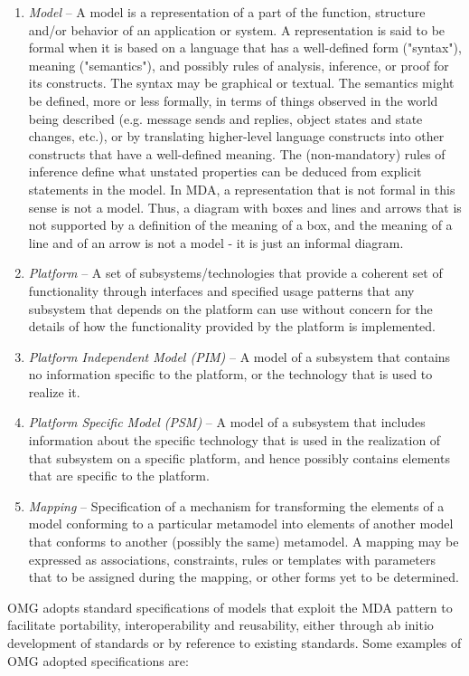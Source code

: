 \begin{enumerate}
\item \textit{Model} -- A model is a representation of a part of the function, structure and/or behavior of an application or system. A representation is said to be formal when it is based on a language that has a well-defined form ("syntax"), meaning ("semantics"), and possibly rules of analysis, inference, or proof for its constructs. The syntax may be graphical or textual. The semantics might be defined, more or less formally, in terms of things observed in the world being described (e.g. message sends and replies, object states and state changes, etc.), or by translating higher-level language constructs into other constructs that have a well-defined meaning. The (non-mandatory) rules of inference define what unstated properties can be deduced from explicit statements in the model. In MDA, a representation that is not formal in this sense is not a model. Thus, a diagram with boxes and lines and arrows that is not supported by a definition of the meaning of a box, and the meaning of a line and of an arrow is not a model - it is just an informal diagram.
\item \textit{Platform} -- A set of subsystems/technologies that provide a coherent set of functionality through interfaces and specified usage patterns that any subsystem that depends on the platform can use without concern for the details of how the functionality provided by the platform is implemented.
\item \textit{Platform Independent Model (PIM)} -- A model of a subsystem that contains no information specific to the platform, or the technology that is used to realize it.
\item \textit{Platform Specific Model (PSM)} -- A model of a subsystem that includes information about the specific technology that is used in the realization of that subsystem on a specific platform, and hence possibly contains elements that are specific to the platform.
\item \textit{Mapping} -- Specification of a mechanism for transforming the elements of a model conforming to a particular metamodel into elements of another model that conforms to another (possibly the same) metamodel. A mapping may be expressed as associations, constraints, rules or templates with parameters that to be assigned during the mapping, or other forms yet to be determined.
\end{enumerate}

OMG adopts standard specifications of models that exploit the MDA pattern to facilitate portability, interoperability and reusability, either through ab initio development of standards or by reference to existing standards. Some examples of OMG adopted specifications are:

